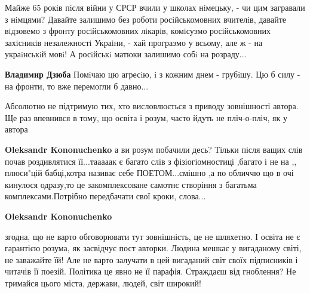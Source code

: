 \begin{itemize}
\begin{itemize}
\begin{itemize}
Майже 65 рокiв пiсля вiйни у СРСР вчили у школах нiмецьку, - чи цим загравали з
нiмцями? Давайте залишимо без роботи росiйськомовних вчителiв, давайте
вiдзовемо з фронту росiйськомовних лiкарiв, комiсуэмо росiйськомовних
захiсникiв незалежностi Украiни, - хай програэмо у всьому, але ж - на
украiнськiй мовi! А росiйськi матюки залишимо собi на розраду...


\textbf{Владимир Дзюба} Помiчаю цю агресiю, i з кожним днем - грубiшу. Цю б силу - на фронти, то вже перемогли б давно...
\end{itemize}


Абсолютно не підтримую тих, хто висловлюється з приводу зовнішності автора. Ще
раз впевнився в тому, що освіта і розум, часто йдуть не пліч-о-пліч, як у
автора

\begin{itemize}

\textbf{Oleksandr Kononuchenko} а ви розум побачили десь? Тільки після ващих слів почав роздивлятися її...тааааак є багато слів з фізіогіомностиці ,багато і не на ,, плюси"цій бабці,котра називає себе ПОЕТОМ...смішно ,а по обличчю що в очі кинулося одразу,то це закомплексоване самотнє створіння з багатьма комплексами.Потрібно передбачати свої кроки, слова...


\textbf{Oleksandr Kononuchenko} 

згодна, що не варто обговорювати тут
зовнішність, це не шляхетно. І освіта не є гарантією розума, як засвідчує пост
авторки. Людина мешкає у вигаданому світі, не заважайте їй! Але не варто
залучати в цей вигаданий світ своїх підписників і читачів її поезій. Політика
це явно не її парафія. Страждаєш від гноблення? Не тримайся цього міста,
держави, людей, світ широкий!




\end{itemize}
\end{itemize}
\end{itemize}
